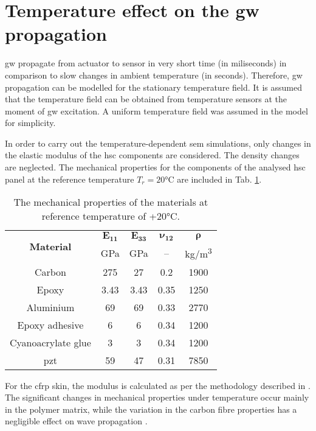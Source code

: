 \section{Temperature effect on the \acs{gw} propagation}
\label{sec:temp}
 
\ac{gw} propagate from actuator to sensor in very short time (in miliseconds) in comparison to slow changes in ambient temperature (in seconds).
Therefore, \ac{gw} propagation can be modelled for the stationary temperature field.
It is assumed that the temperature field can be obtained from temperature sensors at the moment of \ac{gw} excitation.
A uniform temperature field was assumed in the model for simplicity.

In order to carry out the temperature-dependent \ac{sem} simulations, only changes in the elastic modulus of the \ac{hsc} components are considered.
The density changes are neglected.
The mechanical properties for the components of the analysed \ac{hsc} panel at the reference temperature \(T_r=20\)\unit{\degreeCelsius} are included in Tab. \ref{tab:properties}.
\begin{table}[H]
	\small
	\tabcolsep=0.5cm
	\centering
	\caption{\label{tab:properties}The mechanical properties of the materials at reference temperature of +20\unit{\degreeCelsius}.}
	\begin{tabular}{ccccc}\toprule
		\multirow{2}{*}{\textbf{Material}} & $\boldsymbol{E_{11}}$ & $\boldsymbol{E_{33}}$ & $\boldsymbol{\nu_{12}}$ & $\boldsymbol{\rho}$ \\ & \unit{\giga\pascal} & \unit{\giga\pascal} & -- & \unit[per-mode = symbol]{\kilogram\per\cubic\meter}\\
		\midrule
		Carbon & 275 & 27 & 0.2 & 1900\\
		Epoxy & 3.43 & 3.43 & 0.35 & 1250\\
		Aluminium & 69 & 69 & 0.33 & 2770\\
		Epoxy adhesive & 6 & 6 & 0.34 & 1200\\
		Cyanoacrylate glue & 3 & 3 & 0.34 & 1200\\	
		\ac{pzt} &  59 & 47 & 0.31 & 7850\\
		\bottomrule
	\end{tabular}
\end{table}
For the \ac{cfrp} skin, the modulus is calculated as per the methodology described in \cite{chamis1983simplified,salamone2009guided}.
The significant changes in mechanical properties under temperature occur mainly in the polymer matrix, while the variation in the carbon fibre properties has a negligible effect on wave propagation \cite{sikdar2018effects}.
